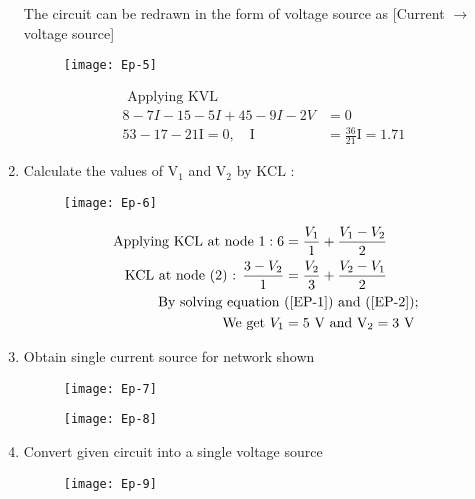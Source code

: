 \begin{enumerate}
\begin{answer}
		The circuit can be redrawn in the form of voltage source as [Current $\rightarrow$ voltage source]
			\begin{figure}[H]
			\centering
			\texttt{[image: Ep-5]}
		\end{figure}
		\begin{align*}
		\text { Applying KVL }\\
		8-7 I-15-5 I+45-9 I-2 V&=0\\
		53-17-21 \mathrm{I}=0, \quad \mathrm{I}&=\frac{36}{21} \mathrm{I}=1.71
		\end{align*}
	\end{answer}
	\item Calculate the values of $\mathrm{V}_{1}$ and $\mathrm{V}_{2}$ by $\mathrm{KCL}$ :
	\begin{figure}[H]
		\centering
		\texttt{[image: Ep-6]}
	\end{figure}
	\begin{answer}
		\begin{align}
		\text { Applying } \mathrm{KCL} \text { at node } 1: 6&=\frac{V_{1}}{1}+\frac{V_{1}-V_{2}}{2}\label{EP-1}\\
		\mathrm{KCL} \text { at node (2) : } \frac{3-V_{2}}{1}&=\frac{V_{2}}{3}+\frac{V_{2}-V_{1}}{2}\label{EP-2}\\
		\text { By solving equation  }&\text{(\ref{EP-1}) and (\ref{EP-2});}\notag\\
		\text { We get } V_{1}&=5 \mathrm{~V} \text { and } \mathrm{V}_{2}=3 \mathrm{~V}\notag
		\end{align}
	\end{answer}
	\item Obtain single current source for network shown
	\begin{figure}[H]
		\centering
		\texttt{[image: Ep-7]}
	\end{figure}
	\begin{answer}
	\begin{figure}[H]
		\centering
		\texttt{[image: Ep-8]}
	\end{figure}
	\end{answer}
	\item Convert given circuit into a single voltage source
	\begin{figure}[H]
		\centering
		\texttt{[image: Ep-9]}
	\end{figure}
	\begin{answer}$\left. \right. $\\

\end{answer}
\end{enumerate}
